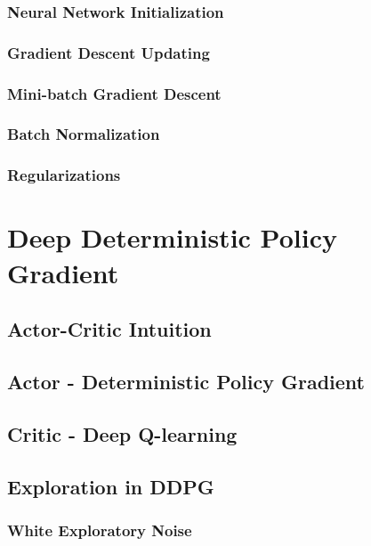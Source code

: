 \subsubsection{Neural Network Initialization}
\subsubsection{Gradient Descent Updating}
\subsubsection{Mini-batch Gradient Descent}
\subsubsection{Batch Normalization}
\subsubsection{Regularizations}




\section{Deep Deterministic Policy Gradient}
\subsection{Actor-Critic Intuition}
\subsection{Actor - Deterministic Policy Gradient}
\subsection{Critic - Deep Q-learning}

\newpage

\subsection{Exploration in DDPG}
\subsubsection{White Exploratory Noise}
